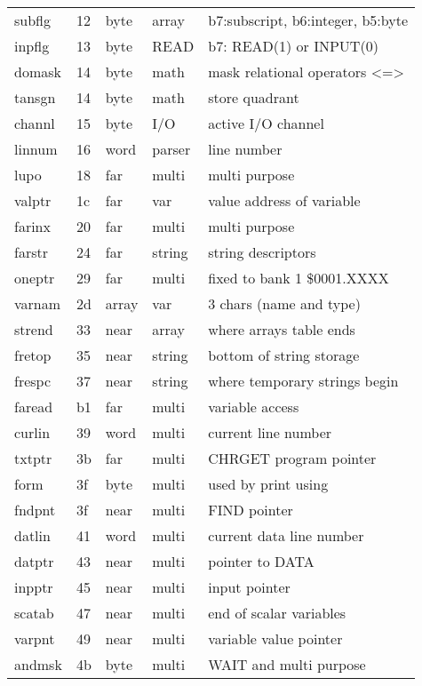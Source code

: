 {\begin{tabular}{|l|l|l|l|l|}
subflg           &   12 & byte   & array  & b7:subscript, b6:integer, b5:byte \\
inpflg           &   13 & byte   & READ   & b7: READ(1) or INPUT(0) \\
domask           &   14 & byte   & math   & mask relational operators <=> \\
tansgn           &   14 & byte   & math   & store quadrant \\
channl           &   15 & byte   & I/O    & active I/O channel \\
linnum           &   16 & word   & parser  & line number \\
lupo             &   18 & far    & multi  & multi purpose \\
valptr           &   1c & far    & var    & value address of variable \\
farinx           &   20 & far    & multi  & multi purpose \\
farstr           &   24 & far    & string  & string descriptors \\
oneptr           &   29 & far    & multi  & fixed to bank 1 \$0001.XXXX \\
varnam           &   2d & array  & var    & 3 chars (name and type) \\
strend           &   33 & near   & array  & where arrays table ends \\
fretop           &   35 & near   & string  & bottom of string storage \\
frespc           &   37 & near   & string  & where temporary strings begin \\
faread           &   b1 & far    & multi  & variable access \\
curlin           &   39 & word   & multi  & current line number \\
txtptr           &   3b & far    & multi  & CHRGET program pointer \\
form             &   3f & byte   & multi  & used by print using \\
fndpnt           &   3f & near   & multi  & FIND pointer \\
datlin           &   41 & word   & multi  & current data line number \\
datptr           &   43 & near   & multi  & pointer to DATA \\
inpptr           &   45 & near   & multi  & input pointer \\
scatab           &   47 & near   & multi  & end of scalar variables \\
varpnt           &   49 & near   & multi  & variable value pointer \\
andmsk           &   4b & byte   & multi  & WAIT and multi purpose \\
\hline
\end{tabular}
}
\newpage
